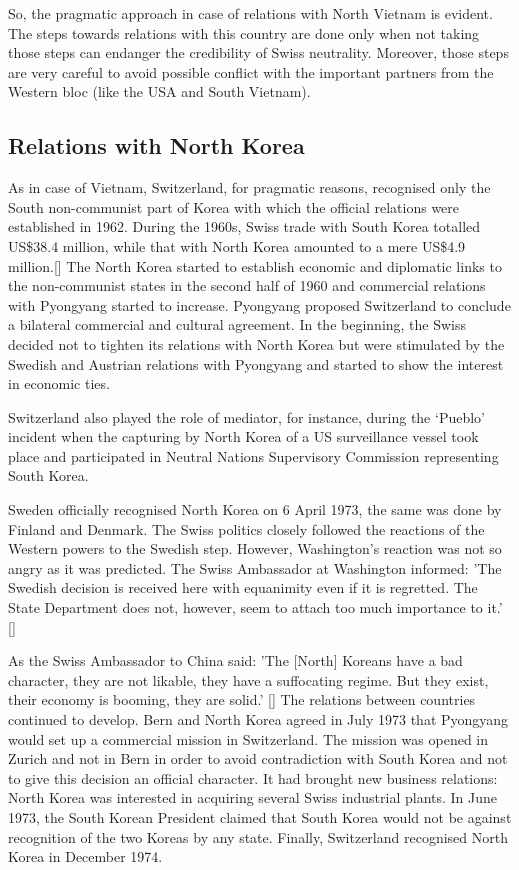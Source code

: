 \documentclass[a4paper]{article}
\begin{document}
So, the pragmatic approach in case of relations with North Vietnam is evident. The steps towards relations with this country are done only when not taking those steps can endanger the credibility of Swiss neutrality. Moreover, those steps are very careful to avoid possible conflict with the important partners from the Western bloc (like the USA and South Vietnam).
\subsection{Relations with North Korea}
As in case of Vietnam, Switzerland, for pragmatic reasons, recognised only the South non-communist part of Korea with which the official relations were established in 1962. During the 1960s, Swiss trade with South Korea totalled US\$38.4 million, while that with North Korea amounted to a mere US\$4.9 million.[]
The North Korea started to establish economic and diplomatic links to the non-communist states in the second half of 1960 and commercial relations with Pyongyang started to increase. Pyongyang proposed Switzerland to conclude a bilateral commercial and cultural agreement. In the beginning, the Swiss decided not to tighten its relations with North Korea but were stimulated by the Swedish and Austrian relations with Pyongyang and started to show the interest in economic ties.

Switzerland also played the role of mediator, for instance, during the ‘Pueblo’ incident when the capturing by North Korea of a US surveillance vessel took place and participated in Neutral Nations Supervisory Commission representing South Korea.

Sweden officially recognised North Korea on 6 April 1973, the same was done by Finland and Denmark. The Swiss politics closely followed the reactions of the Western powers to the Swedish step. However, Washington's reaction was not so angry as it was predicted. The Swiss Ambassador at Washington informed: 'The Swedish decision is received here with equanimity even if it is regretted. The State Department does not, however, seem to attach too much importance to it.' []

As the Swiss Ambassador to China said: 'The [North] Koreans have a bad character, they are not likable, they have a suffocating regime. But they exist, their economy is booming, they are solid.' [] The relations between countries continued to develop. Bern and North Korea agreed in July 1973 that Pyongyang would set up a commercial mission in Switzerland. The mission was opened in Zurich and not in Bern in order to avoid contradiction with South Korea and not to give this decision an official character. It had brought new business relations: North Korea was interested in acquiring several Swiss industrial plants. In June 1973, the South Korean President claimed that South Korea would not be against recognition of the two Koreas by any state. Finally, Switzerland recognised North Korea in December 1974.
\end{document}
